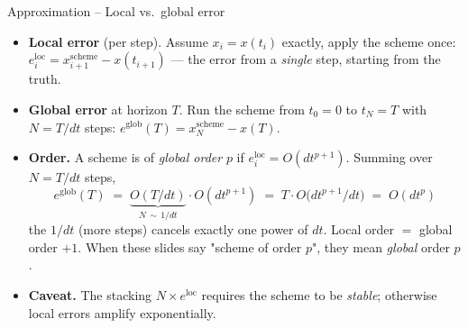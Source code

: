 \documentclass[11pt,aspectratio=169]{beamer}
\begin{document}
\begin{frame}{Approximation -- Local vs.\ global error}

\begin{itemize}

\item \textbf{Local error} (per step). Assume $x_i = x(t_i)$ exactly,
  apply the scheme once:
  $e_i^{\text{loc}} = x_{i+1}^{\text{scheme}} - x(t_{i+1})$ — the
  error from a \emph{single} step, starting from the truth.\newline

\item \textbf{Global error} at horizon $T$. Run the scheme from $t_0
  = 0$ to $t_N = T$ with $N = T/dt$ steps:
  $e^{\text{glob}}(T) = x_N^{\text{scheme}} - x(T)$.\newline

\item \textbf{Order.} A scheme is of \emph{global order} $p$ if
  $e_i^{\text{loc}} = O(dt^{p+1})$. Summing over $N = T/dt$ steps,
  \[
  e^{\text{glob}}(T) \;=\; \underbrace{O(T/dt)}_{N\,\sim\,1/dt}\cdot O(dt^{p+1})
  \;=\; T\cdot O\!\bigl(dt^{p+1}/dt\bigr) \;=\; O(dt^p)
  \]
  the $1/dt$ (more steps) cancels exactly one power of $dt$.
  Local order $=$ global order $+ 1$. When these slides say "scheme
  of order $p$", they mean \emph{global} order $p$.\newline

\item \textbf{Caveat.} The stacking $N\times e^{\text{loc}}$ requires
  the scheme to be \emph{stable}; otherwise local errors amplify
  exponentially.

\end{itemize}

\end{frame}
\end{document}
